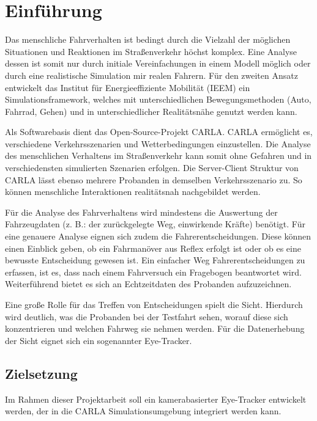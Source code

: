 \section{Einführung}
\setlength{\parskip}{6pt plus 2pt minus 1pt}

Das menschliche Fahrverhalten ist bedingt durch die Vielzahl der möglichen Situationen und Reaktionen im Straßenverkehr höchst komplex. Eine Analyse dessen ist somit nur durch initiale Vereinfachungen in einem Modell möglich oder durch eine realistische Simulation mir realen Fahrern. Für den zweiten Ansatz entwickelt das Institut für Energieeffiziente Mobilität (IEEM) ein Simulationsframework, welches mit unterschiedlichen Bewegungsmethoden (Auto, Fahrrad, Gehen) und in unterschiedlicher Realitätsnähe genutzt werden kann.

Als Softwarebasis dient das Open-Source-Projekt CARLA. CARLA ermöglicht es, verschiedene Verkehrsszenarien und Wetterbedingungen einzustellen. Die Analyse des menschlichen Verhaltens im Straßenverkehr kann somit ohne Gefahren und in verschiedensten simulierten Szenarien erfolgen. Die Server-Client Struktur von CARLA lässt ebenso mehrere Probanden in demselben Verkehrsszenario zu. So können menschliche Interaktionen realitätsnah nachgebildet werden.

Für die Analyse des Fahrverhaltens wird mindestens die Auswertung der Fahrzeugdaten (z. B.: der zurückgelegte Weg, einwirkende Kräfte) benötigt. Für eine genauere Analyse eignen sich zudem die Fahrerentscheidungen. Diese können einen Einblick geben, ob ein Fahrmanöver aus Reflex erfolgt ist oder ob es eine bewusste Entscheidung gewesen ist. Ein einfacher Weg Fahrerentscheidungen zu erfassen, ist es, dass nach einem Fahrversuch ein Fragebogen beantwortet wird. Weiterführend bietet es sich an Echtzeitdaten des Probanden aufzuzeichnen.

Eine große Rolle für das Treffen von Entscheidungen spielt die Sicht. Hierdurch wird deutlich, was die Probanden bei der Testfahrt sehen, worauf diese sich konzentrieren und welchen Fahrweg sie nehmen werden. Für die Datenerhebung der Sicht eignet sich ein sogenannter Eye-Tracker.

\subsection{Zielsetzung}

Im Rahmen dieser Projektarbeit soll ein kamerabasierter Eye-Tracker entwickelt werden, der in die CARLA Simulationsumgebung integriert werden kann.

